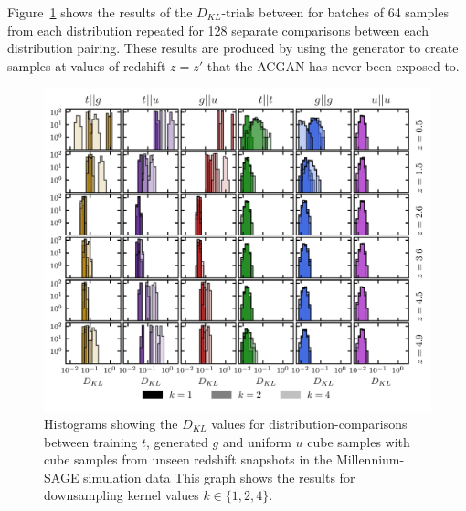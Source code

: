 \documentclass[twocolumn]{article}
\numberwithin{equation}{section}
\begin{document}
Figure~\ref{fig:kl_trials_all_z2} shows the results of the $D_{KL}$-trials between for batches of 64 
samples from each distribution repeated for 128 separate comparisons between each distribution pairing. These results are 
produced by using the generator to create samples at values of redshift $z=z'$ that the ACGAN has never been exposed to.

\begin{figure}[hbt!]
\includegraphics[width=17cm]{figures/graphs/kl_trials_all_z_unseen1.png}
\centering
\caption{Histograms showing the $D_{KL}$ values for distribution-comparisons between training $t$, generated $g$ and 
         uniform $u$ cube samples with cube samples from unseen redshift snapshots in the Millennium-SAGE simulation 
         data This graph shows the results for downsampling kernel values $k \in \{1, 2, 4\}$.}
\label{fig:kl_trials_all_z2}
\end{figure}

    
\end{document}
